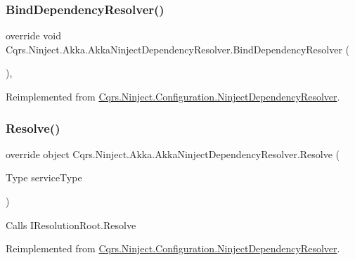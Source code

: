 \subsubsection{\texorpdfstring{Bind\+Dependency\+Resolver()}{BindDependencyResolver()}}
{\footnotesize\ttfamily override void Cqrs.\+Ninject.\+Akka.\+Akka\+Ninject\+Dependency\+Resolver.\+Bind\+Dependency\+Resolver (\begin{DoxyParamCaption}{ }\end{DoxyParamCaption})\hspace{0.3cm}{\ttfamily [protected]}, {\ttfamily [virtual]}}



Reimplemented from \hyperlink{classCqrs_1_1Ninject_1_1Configuration_1_1NinjectDependencyResolver_a2b663d936fcded5f679623bf0b0393e6_a2b663d936fcded5f679623bf0b0393e6}{Cqrs.\+Ninject.\+Configuration.\+Ninject\+Dependency\+Resolver}.

\mbox{\label{classCqrs_1_1Ninject_1_1Akka_1_1AkkaNinjectDependencyResolver_adace29de71f10e34e952bd41e48106a6_adace29de71f10e34e952bd41e48106a6}} 
\subsubsection{\texorpdfstring{Resolve()}{Resolve()}\hspace{0.1cm}{\footnotesize\ttfamily [1/2]}}
{\footnotesize\ttfamily override object Cqrs.\+Ninject.\+Akka.\+Akka\+Ninject\+Dependency\+Resolver.\+Resolve (\begin{DoxyParamCaption}\item[{Type}]{service\+Type }\end{DoxyParamCaption})\hspace{0.3cm}{\ttfamily [virtual]}}



Calls I\+Resolution\+Root.\+Resolve 



Reimplemented from \hyperlink{classCqrs_1_1Ninject_1_1Configuration_1_1NinjectDependencyResolver_aef2a2be58a2562a349572e9946cd2930_aef2a2be58a2562a349572e9946cd2930}{Cqrs.\+Ninject.\+Configuration.\+Ninject\+Dependency\+Resolver}.

